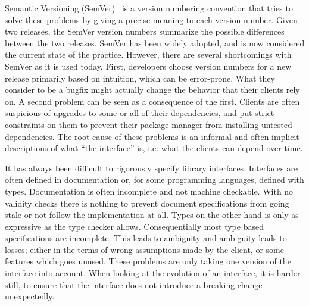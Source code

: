 Semantic Versioning (SemVer)~\cite{semver} is a version numbering
convention that tries to solve these problems by giving a precise
meaning to each version number. Given two releases, the SemVer version
numbers summarize the possible differences between the two
releases. SemVer has been widely adopted, and is now considered the
current state of the practice.
%
%
However, there are several shortcomings with SemVer as it is used
today.
%
First, developers choose version numbers for a new release primarily
based on intuition, which can be error-prone. What they consider to be
a bugfix might actually change the behavior that their clients rely
on.
%
A second problem can be seen as a consequence of the first. Clients
are often suspicious of upgrades to some or all of their dependencies,
and put strict constraints on them to prevent their package manager
from installing untested dependencies. 
%
The root cause of these problems is an informal and often implicit
descriptions of what ``the interface'' is, i.e. what the clients can
depend over time.

It has always been difficult to rigorously specify library interfaces.
Interfaces are often defined in documentation or, for some programming
languages, defined with types. 
%
Documentation is often incomplete and not machine checkable. With no
validity checks there is nothing to prevent document specifications from
going stale or not follow the implementation at all. 
%
Types on the other hand is only as expressive as the type checker
allows. Consequentially most type based specifications are incomplete. 
This leads to ambiguity and ambiguity leads to losses; either in the terms of
wrong assumptions made by the client, or some features which goes unused. 
%
These problems are only taking one version of the interface into
account. When looking at the evolution of an interface, it is harder
still, to ensure that the interface does not introduce a breaking change
unexpectedly. 

